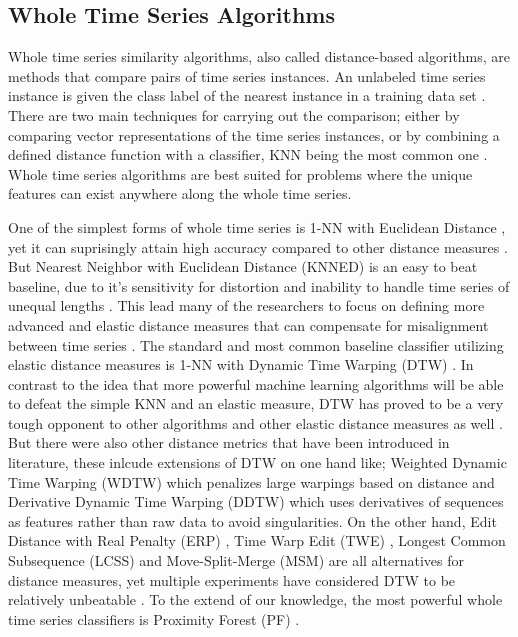 \subsection{Whole Time Series Algorithms}
\label{SubsectionWhole}
Whole time series similarity algorithms, also called distance-based algorithms, are methods that compare pairs of time series instances.
An unlabeled time series instance is given the class label of the nearest instance in a training data set \cite{kate2016using}.
There are two main techniques for carrying out the comparison;
either by comparing vector representations of the time series instances,
or by combining a defined distance function with a classifier, KNN being the most common one \cite{lines2018time}.
Whole time series algorithms are best suited for problems where the unique features can exist anywhere along the whole time series\cite{bagnall2017great}.

One of the simplest forms of whole time series is 1-NN with Euclidean Distance \cite{faloutsos1994fast}, yet it can suprisingly attain high accuracy compared to other distance measures \cite{xing2010brief}.
But Nearest Neighbor with Euclidean Distance (KNNED) is an easy to beat baseline, due to it's sensitivity for distortion and inability to handle time series of unequal lengths \cite{xing2010brief,kate2016using,lines2018time}.
This lead many of the researchers to focus on defining more advanced and elastic distance measures that can compensate for misalignment between time series \cite{abanda2019review}.
The standard and most common baseline classifier utilizing elastic distance measures is 1-NN with Dynamic Time Warping (DTW) \cite{bagnall2017great}.
In contrast to the idea that more powerful machine learning algorithms will be able to defeat the simple KNN and an elastic measure,
DTW has proved to be a very tough opponent to other algorithms and other elastic distance measures as well \cite{kate2016using,lines2015time,wang2013experimental}.
But there were also other distance metrics that have been introduced in literature, these inlcude extensions of DTW on one hand like; Weighted Dynamic Time Warping (WDTW) which penalizes large warpings based on distance \cite{jeong2011weighted}
and Derivative Dynamic Time Warping (DDTW) \cite{keogh2001derivative,gorecki2013using} which uses derivatives of sequences as features rather than raw data to avoid singularities.
On the other hand, Edit Distance with Real Penalty (ERP) \cite{chen2004marriage}, Time Warp Edit (TWE) \cite{marteau2008time}, Longest Common Subsequence (LCSS) \cite{das1997finding} and Move-Split-Merge (MSM) \cite{stefan2012move}
are all alternatives for distance measures, yet multiple experiments have considered DTW to be relatively unbeatable \cite{bagnall2017great,abanda2019review,bostrom2017shapelet}.
To the extend of our knowledge, the most powerful whole time series classifiers is Proximity Forest (PF) \cite{lucas2019proximity}.


